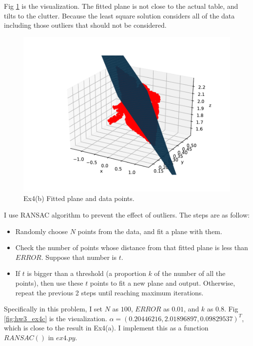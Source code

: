 \documentclass[
  course = {{16-811 Math Fundamentals for Robotics}},
  quartile = {{1}},
  assignment = 3,
  name = {{Kangle Deng}},
  email = {{kangled@andrew.cmu.edu}},
  firstexercise = 1
]{aga-homework}
\begin{document}
\subexercise

Fig \ref{fig:hw3_ex4b} is the visualization. The fitted plane is not close to the actual table, and tilts to the clutter. Because the least square solution considers all of the data including those outliers that should not be considered.


\begin{figure}
    \centering
    \includegraphics{math/fig/hw3/ex4b.pdf}
    \caption{Ex4(b) Fitted plane and data points.}
    \label{fig:hw3_ex4b}
\end{figure}

\subexercise

I use RANSAC algorithm to prevent the effect of outliers. The steps are as follow:

\begin{itemize}
    \item Randomly choose $N$ points from the data, and fit a plane with them.
    \item Check the number of points whose distance from that fitted plane is less than $ERROR$. Suppose that number is $t$.
    \item If $t$ is bigger than a threshold (a proportion $k$ of the number of all the points), then use these $t$ points to fit a new plane and output. Otherwise, repeat the previous 2 steps until reaching maximum iterations.
\end{itemize}

Specifically in this problem, I set $N$ as $100$, $ERROR$ as $0.01$, and $k$ as $0.8$. Fig \ref{fig:hw3_ex4c} is the visualization. $\alpha = (0.20446216,2.01896897,0.09829537)^T$, which is close to the result in Ex4(a). I implement this as a function $RANSAC()$ in $ex4.py$.
\end{document}
